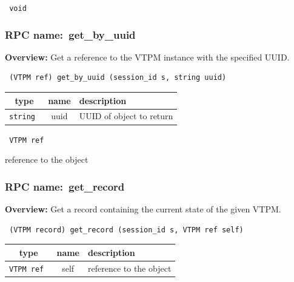 \vspace{0.3cm}

{\tt 
void
}



\vspace{0.3cm}
\vspace{0.3cm}
\vspace{0.3cm}
\subsubsection{RPC name:~get\_by\_uuid}

{\bf Overview:} 
Get a reference to the VTPM instance with the specified UUID.

\begin{verbatim} (VTPM ref) get_by_uuid (session_id s, string uuid)\end{verbatim}



 
\vspace{0.3cm}
\begin{tabular}{|c|c|p{7cm}|}
 \hline
{\bf type} & {\bf name} & {\bf description} \\ \hline
{\tt string } & uuid & UUID of object to return \\ \hline 

\end{tabular}

\vspace{0.3cm}

{\tt 
VTPM ref
}


reference to the object
\vspace{0.3cm}
\vspace{0.3cm}
\vspace{0.3cm}
\subsubsection{RPC name:~get\_record}

{\bf Overview:} 
Get a record containing the current state of the given VTPM.

\begin{verbatim} (VTPM record) get_record (session_id s, VTPM ref self)\end{verbatim}



 
\vspace{0.3cm}
\begin{tabular}{|c|c|p{7cm}|}
 \hline
{\bf type} & {\bf name} & {\bf description} \\ \hline
{\tt VTPM ref } & self & reference to the object \\ \hline 

\end{tabular}

